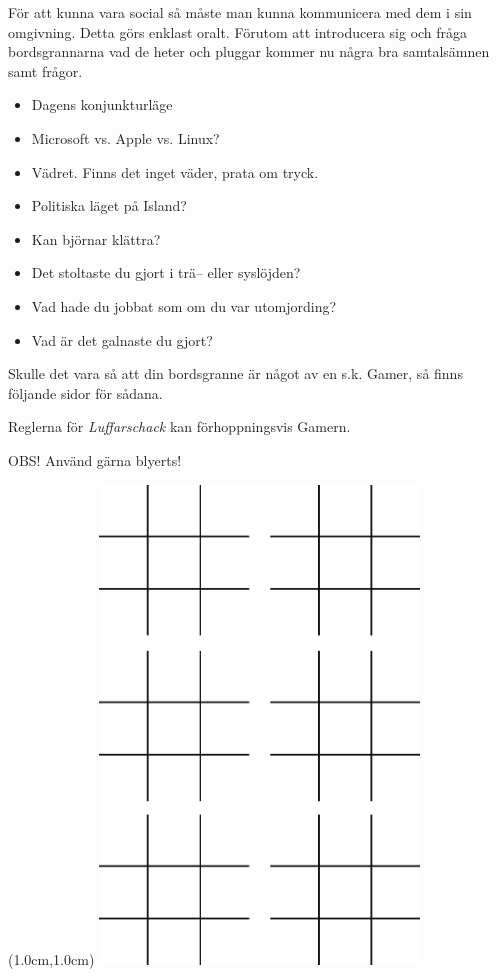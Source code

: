 För att kunna vara social så måste man kunna kommunicera med dem i sin omgivning. 
Detta görs enklast oralt. Förutom att introducera sig och fråga bordsgrannarna vad de 
heter och pluggar kommer nu några bra samtalsämnen samt frågor.
\\
\begin{itemize}[itemsep=0.0em]
  \item Dagens konjunkturläge
  \item Microsoft vs. Apple vs. Linux?
  \item Vädret. Finns det inget väder, prata om tryck.
  \item Politiska läget på Island?
  \item Kan björnar klättra?
  \item Det stoltaste du gjort i trä– eller syslöjden?
  \item Vad hade du jobbat som om du var utomjording?
  \item Vad är det galnaste du gjort?
\end{itemize}


Skulle det vara så att din bordsgranne är något av en s.k. Gamer, så finns följande sidor för sådana.

Reglerna för \textit{Luffarschack} kan förhoppningsvis Gamern.

OBS! Använd gärna blyerts!

\newpage

\thispagestyle{plainnohead}

\phantom{osynlig text}

\begin{textblock*}{3cm}(1.0cm,1.0cm) %
   \includegraphics[width=8.5cm]{./bilder/luffarschack.png}
\end{textblock*}


